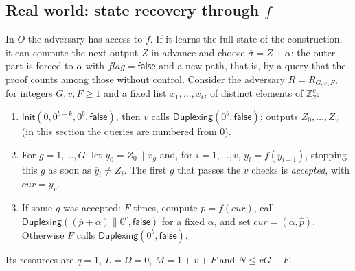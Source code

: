 \documentclass[11pt,a4paper]{article}
\theoremstyle{definition}
\theoremstyle{remark}
\newcommand{\flag}{\mathit{flag}}
\newcommand{\false}{\mathsf{false}}
\newcommand{\Z}{\mathbb{Z}}
\newcommand{\outp}[1]{\overline{#1}}
\newcommand{\inp}[1]{\widehat{#1}}
\begin{document}
\subsection{Real world: state recovery through \texorpdfstring{$f$}{f}}
In $O$ the adversary has access to $f$. If it learns the full state of the construction, it can compute the next
output $Z$ in advance and choose $\outp{\sigma} = Z + \alpha$: the outer part is forced to $\alpha$ with $\flag = \false$ and a new
path, that is, by a query that the proof counts among those without control. Consider the adversary
$R = R_{G, v, F}$, for integers $G, v, F \ge 1$ and a fixed list $x_1, \dots, x_G$ of distinct elements of $\Z_2^c$:
\begin{enumerate}[leftmargin=*,itemsep=1pt]
\item $\mathsf{Init}(0, 0^{b-k}, 0^b, \false)$, then $v$ calls $\mathsf{Duplexing}(0^b, \false)$; outputs $Z_0, \dots, Z_v$ (in this
section the queries are numbered from $0$).
\item For $g = 1, \dots, G$: let $y_0 = Z_0 \| x_g$ and, for $i = 1, \dots, v$, $y_i = f(y_{i-1})$, stopping this $g$ as soon as
$\outp{y}_i \ne Z_i$. The first $g$ that passes the $v$ checks is \emph{accepted}, with $\mathit{cur} = y_v$.
\item If some $g$ was accepted: $F$ times, compute $p = f(\mathit{cur})$, call
$\mathsf{Duplexing}((\outp{p} + \alpha) \| 0^c, \false)$ for a fixed $\alpha$, and set $\mathit{cur} = (\alpha, \inp{p})$. Otherwise $F$
calls $\mathsf{Duplexing}(0^b, \false)$.
\end{enumerate}
Its resources are $q = 1$, $L = \Omega = 0$, $M = 1 + v + F$ and $N \le vG + F$.
\end{document}
